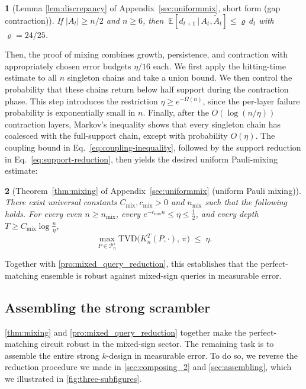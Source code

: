 \documentclass[
    aps,
    superscriptaddress,
    onecolumn,
    10pt,
    prx,
    nofootinbib
]{revtex4-2}
\newcommand{\E}{\mathbb E}
\theoremstyle{namedstatement}
\newtheorem*{namedstatementInner}{}
\theoremstyle{plain}
\newenvironment{restatement}[1]{%
    \begin{namedstatementInner}[#1]%
}{%
    \end{namedstatementInner}%
}
\begin{document}
\begin{restatement}{Lemma \ref{lem:discrepancy} of Appendix~\ref{sec:uniformmix}, short form (gap contraction)}
If $|A_{t}|\geq n/2$ and $n\geq6$, then
$\ \E[d_{t+1}\,|\,A_{t},\widetilde{A}_{t}]\leq\varrho\,d_{t}$ with
$\varrho=24/25$.
\end{restatement}

Then, the proof of mixing combines growth, persistence, and contraction with appropriately chosen error budgets $\eta/16$ each. We first apply the hitting-time estimate to all $n$ singleton chains and take a union bound. We then control the probability that these chains return below half support during the contraction phase. This step introduces the restriction $\eta\geq e^{-\Omega(n)}$, since the per-layer failure probability is exponentially small in $n$. Finally, after the $O(\log(n/\eta))$ contraction
layers, Markov's inequality shows that every singleton chain has coalesced with the full-support chain, except with probability $O(\eta)$. The coupling bound in Eq.~\eqref{eq:coupling-inequality}, followed by the support reduction in Eq.~\eqref{eq:support-reduction}, then yields the desired uniform Pauli-mixing estimate:

\begin{restatement}{Theorem~\ref{thm:mixing} of Appendix~\ref{sec:uniformmix}
(uniform Pauli mixing)}
There exist universal constants $C_{\mathrm{mix}},c_{\mathrm{mix}}>0$ and $n_{\mathrm{mix}}$ such that the following holds. For every even $n\ge n_{\mathrm{mix}}$, every
$e^{-c_{\mathrm{mix}}n}\le\eta\le\tfrac12$, and every depth
$T\ge C_{\mathrm{mix}}\log\tfrac n\eta$,
\begin{equation}\label{eq:mixing}
  \max_{P\in\mathcal P_n^\star}\mathrm{TVD}\big(K_n^T(P,\cdot),\,\pi\big)\;\le\;\eta.
\end{equation}
\end{restatement}
Together with \cref{pro:mixed_query_reduction}, this establishes that the perfect-matching ensemble is robust against mixed-sign queries in measurable error.

\subsection{Assembling the strong scrambler}\label{sec:methods-assembly}

\cref{thm:mixing} and \cref{pro:mixed_query_reduction} together make the perfect-matching circuit robust in the mixed-sign sector. The remaining task is to assemble the entire strong $k$-design in measurable error. To do so, we reverse the reduction procedure we made in \cref{sec:composing_2} and \cref{sec:assembling}, which we illustrated in \cref{fig:three-subfigures}. 
\end{document}
